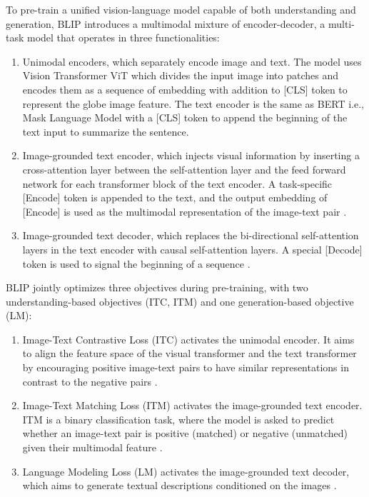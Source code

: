 \documentclass[pdflatex,sn-mathphys-num]{sn-jnl}%
\begin{document}
To pre-train a unified vision-language model capable of both understanding and generation, BLIP introduces a multimodal mixture of encoder-decoder, a multi-task model that operates in three functionalities:
\begin{enumerate}
\item Unimodal encoders, which separately encode image and text. The model uses Vision Transformer ViT \cite{dosovitskiy2021image} which divides the input image into patches and encodes them as a sequence of embedding with addition to [CLS] token to represent the globe image feature. The text encoder is the same as BERT i.e., Mask Language Model \cite{devlin2019bert} with a [CLS] token to append the beginning of the text input to summarize the sentence.
\item Image-grounded text encoder, which injects visual information by inserting a cross-attention layer between the self-attention layer and the feed forward network for each transformer block of the text encoder. A task-specific [Encode] token is appended to the text, and the output embedding of [Encode] is used as the multimodal representation of the image-text pair \cite{li2022blipblog}.
\item Image-grounded text decoder, which replaces the bi-directional self-attention layers in the text encoder with causal self-attention layers. A special [Decode] token is used to signal the beginning of a sequence \cite{li2022blipblog}.
\end{enumerate}

BLIP jointly optimizes three objectives during pre-training, with two understanding-based objectives (ITC, ITM) and one generation-based objective (LM):

\begin{enumerate}
\item Image-Text Contrastive Loss (ITC) activates the unimodal encoder. It aims to align the feature space of the visual transformer and the text transformer by encouraging positive image-text pairs to have similar representations in contrast to the negative pairs \cite{li2022blipblog}.
\item Image-Text Matching Loss (ITM) activates the image-grounded text encoder. ITM is a binary classification task, where the model is asked to predict whether an image-text pair is positive (matched) or negative (unmatched) given their multimodal feature \cite{li2022blipblog}.
\item Language Modeling Loss (LM) activates the image-grounded text decoder, which aims to generate textual descriptions conditioned on the images \cite{li2022blipblog}.
\end{enumerate}
\end{document}
